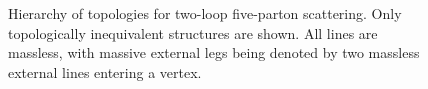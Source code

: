 \begin{figure}[ht]
\begin{center}
  \end{center}
  \caption{Hierarchy of topologies for two-loop five-parton scattering.
    Only topologically inequivalent structures are shown. All lines
  are massless, with massive external legs being denoted by two massless external lines entering a vertex.}
  \label{fig:PropagatorStructures}
\end{figure}


